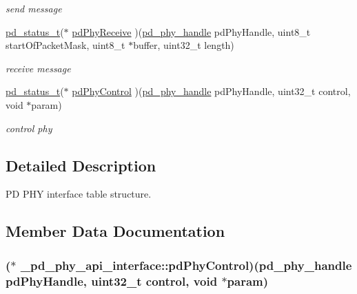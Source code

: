 \begin{DoxyCompactItemize}
\begin{DoxyCompactList}\small\item\em send message \end{DoxyCompactList}\item 
\hyperlink{group__usb__pd__stack_ga04a1f331d9807a70ab9bb753f5ed1c80}{pd\-\_\-status\-\_\-t}($\ast$ \hyperlink{struct__pd__phy__api__interface_a3c8508914afbcb4f55578a0d61cd90e3}{pd\-Phy\-Receive} )(\hyperlink{group__usb__pd__stack_gab39e13c5c0808b2fe22b7dac49db335a}{pd\-\_\-phy\-\_\-handle} pd\-Phy\-Handle, uint8\-\_\-t start\-Of\-Packet\-Mask, uint8\-\_\-t $\ast$buffer, uint32\-\_\-t length)
\begin{DoxyCompactList}\small\item\em receive message \end{DoxyCompactList}\item 
\hyperlink{group__usb__pd__stack_ga04a1f331d9807a70ab9bb753f5ed1c80}{pd\-\_\-status\-\_\-t}($\ast$ \hyperlink{struct__pd__phy__api__interface_a5e422dbfd66fca34934e39b451f17094}{pd\-Phy\-Control} )(\hyperlink{group__usb__pd__stack_gab39e13c5c0808b2fe22b7dac49db335a}{pd\-\_\-phy\-\_\-handle} pd\-Phy\-Handle, uint32\-\_\-t control, void $\ast$param)
\begin{DoxyCompactList}\small\item\em control phy \end{DoxyCompactList}\end{DoxyCompactItemize}


\subsection{Detailed Description}
P\-D P\-H\-Y interface table structure. 

\subsection{Member Data Documentation}
\hypertarget{struct__pd__phy__api__interface_a5e422dbfd66fca34934e39b451f17094}{
\subsubsection[{pd\-Phy\-Control}]{($\ast$ \-\_\-pd\-\_\-phy\-\_\-api\-\_\-interface\-::pd\-Phy\-Control)({\bf pd\-\_\-phy\-\_\-handle} pd\-Phy\-Handle, uint32\-\_\-t control, void $\ast$param)}}\label{struct__pd__phy__api__interface_a5e422dbfd66fca34934e39b451f17094}


